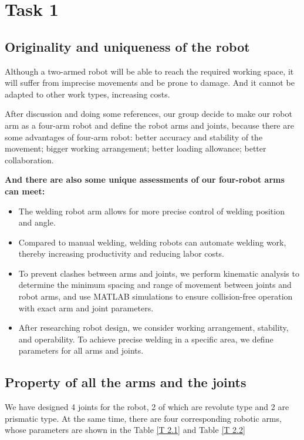 \section{Task 1}
\FloatBarrier %


\subsection{Originality and uniqueness of the robot}


Although a two-armed robot will be able to reach the required working space, it will suffer from imprecise movements and be prone to damage. And it cannot be adapted to other work types, increasing costs. 

After discussion and doing some references, our group decide to make our robot arm as a four-arm robot and define the robot arms and joints, because there are some advantages of four-arm robot: better accuracy and stability of the movement; bigger working arrangement; better loading allowance; better collaboration.

\textbf{And there are also some unique assessments of our four-robot arms can meet:}
\begin{itemize}
    \item The welding robot arm allows for more precise control of welding position and angle.
    \item Compared to manual welding, welding robots can automate welding work, thereby increasing productivity and reducing labor costs.
    \item To prevent clashes between arms and joints, we perform kinematic analysis to determine the minimum spacing and range of movement between joints and robot arms, and use MATLAB simulations to ensure collision-free operation with exact arm and joint parameters.
    \item After researching robot design, we consider working arrangement, stability, and operability. To achieve precise welding in a specific area, we define parameters for all arms and joints.
\end{itemize}

\subsection{Property of all the arms and the joints}

We have designed 4 joints for the robot, 2 of which are revolute type and 2 are prismatic type. At the same time, there are four corresponding robotic arms, whose parameters are shown in the Table \ref{T 2.1} and Table \ref{T 2.2}

